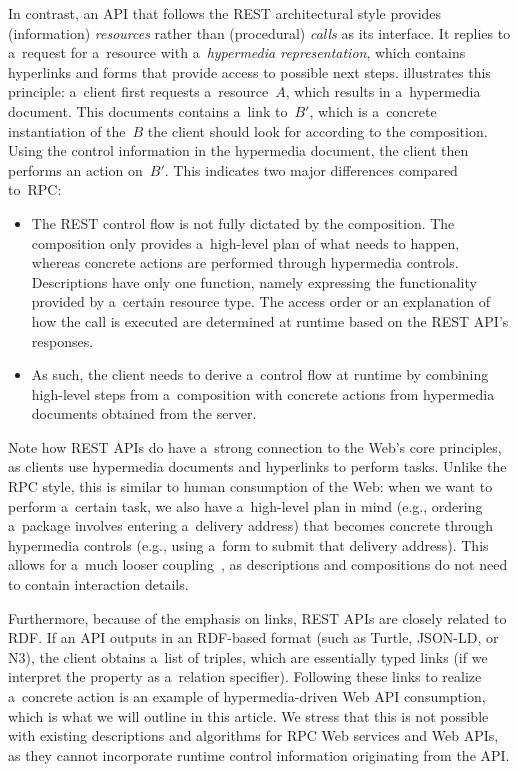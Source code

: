 In contrast, an API that follows the REST architectural style
provides (information) \emph{resources} rather than (procedural) \emph{calls} as its interface.
It replies to a~request for a~resource with a~\emph{hypermedia representation},
which contains hyperlinks and forms that provide access to possible next steps.
 illustrates this principle:
a~client first requests a~resource~$A$,
which results in a~hypermedia document.
This documents contains a~link to~$B'$,
which is a~concrete instantiation of the~$B$
the client should look for according to the composition.
Using the control information in the hypermedia document,
the client then performs an action on~$B'$.
This indicates two major differences compared to~RPC:
\begin{itemize}
  \item The REST control flow is not fully dictated by the composition.
        The composition only provides a~high-level plan of what needs to happen,
        whereas concrete actions are performed through hypermedia controls.
        Descriptions have only one function,
        namely expressing the functionality provided by a~certain resource type.
        The access order or an explanation of how the call is executed
        are determined at runtime based on the REST API's responses.
  \item As such, the client needs to derive a~control flow at runtime
        by combining high-level steps from a~composition
        with concrete actions from hypermedia documents obtained from the server.
\end{itemize}

Note how REST APIs do have a~strong connection to the Web's core principles,
as clients use hypermedia documents and hyperlinks to perform tasks.
Unlike the RPC style, this is similar to human consumption of the Web:
when we want to perform a~certain task, we also have a~high-level plan in mind
(e.g., ordering a~package involves entering a~delivery address)
that becomes concrete through hypermedia controls
(e.g., using a~form to submit that delivery address).
This allows for a~much looser coupling~\cite{WebLooselyCoupled},
as descriptions and compositions do not need to contain interaction details.

Furthermore, because of the emphasis on links,
REST APIs are closely related to RDF.
If an API outputs in an RDF-based format (such as Turtle, JSON-LD, or N3),
the client obtains a~list of triples,
which are essentially typed links (if we interpret the property as a~relation specifier).
Following these links to realize a~concrete action
is an example of hypermedia-driven Web API consumption,
which is what we will outline in this article.
We stress that this is not possible with existing descriptions and algorithms
for RPC Web services and Web APIs,
as they cannot incorporate runtime control information originating from the API.

